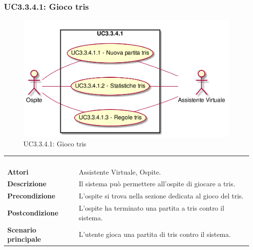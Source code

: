 \newpage\subsubsection{UC3.3.4.1: Gioco tris}
\label{UC3.3.4.1}
\begin{figure}[h]
	\centering
	\includegraphics[width=\textwidth,height=\textheight,keepaspectratio]{images/UseCaseUC3341.png}
	\caption{UC3.3.4.1: Gioco tris}
\end{figure}
\begin{longtable}{l|p{10cm}}
	\rowcolor[gray]{0.8} \multicolumn{2}{c}{} \\
	\rowcolor[gray]{0.8} \multicolumn{2}{c}{\textbf{UC3.3.4.1 - Gioco tris}} \\
	\rowcolor[gray]{0.8} \multicolumn{2}{c}{} \\
	\hline
	&\\
	\textbf{Attori} & Assistente Virtuale, Ospite.\\[7pt]
	\textbf{Descrizione} & Il sistema può permettere all'ospite di giocare a tris.\\[7pt]
	\textbf{Precondizione} & L'ospite si trova nella sezione dedicata al gioco del tris.\\[7pt]
	\textbf{Postcondizione} & L'ospite ha terminato una partita a tris contro il sistema.\\[7pt]
	\textbf{Scenario principale} &L'utente gioca una partita di tris contro il sistema.\\[7pt]\hline
\end{longtable}

